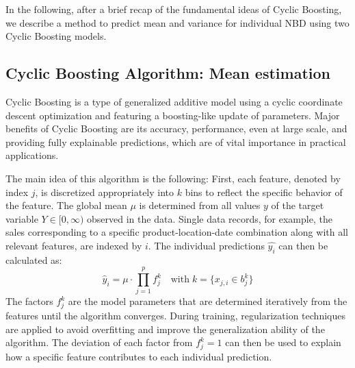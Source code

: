 \documentclass[BCOR=1mm, DIV=calc,10pt,
twoside=true,
twocolumn,
headings=normal]{scrartcl}
\begin{document}
In the following, after a brief recap of the fundamental ideas of Cyclic Boosting, we describe a method to predict mean and variance for individual NBD using two Cyclic Boosting models.

\subsection{Cyclic Boosting Algorithm: Mean estimation}
\label{sec:CB}

Cyclic Boosting \cite{Wick2019} is a type of generalized additive model using a cyclic coordinate descent optimization and featuring a boosting-like update of parameters. Major benefits of Cyclic Boosting are its accuracy, performance, even at large scale, and providing fully explainable predictions, which are of vital importance in practical applications.

The main idea of this algorithm is the following: First, each feature, denoted by index $j$, is discretized appropriately into $k$ bins to reflect the specific behavior of the feature. The global mean $\mu$ is determined from all values $y$ of the  target variable $Y \in [0,\infty)$ observed in the data. Single data records, for example, the sales corresponding to a specific product-location-date combination along with all relevant features, are indexed by $i$.
The individual predictions $\hat{y_i}$  can then be calculated as:
\begin{equation} \label{eqn:cb}
\hat{y}_i = \mu \cdot \prod \limits_{j=1}^p f^k_j \quad \text{with}\; k=\{ x_{j,i} \in b^k_j\}
\end{equation}
The factors $f^k_j$ are the model parameters that are determined iteratively from the features until the algorithm converges. During training, regularization techniques are applied to avoid overfitting and improve the generalization ability of the algorithm. The deviation of each factor from $f^k_j=1$ can then be used to explain how a specific feature contributes to each individual prediction.
\end{document}
